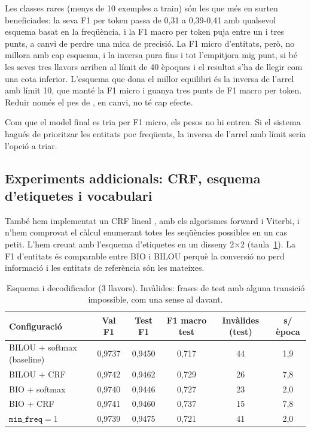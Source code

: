 Les classes rares (menys de 10 exemples a train) són les que més en surten beneficiades: la seva F1 per token passa
de 0,31 a 0,39-0,41 amb qualsevol esquema basat en la freqüència, i la F1 macro per token puja entre un i tres
punts, a canvi de perdre una mica de precisió. La F1 micro d'entitats, però, no millora amb cap esquema, i la
inversa pura fins i tot l'empitjora mig punt, si bé les seves tres llavors arriben al límit de 40 èpoques i el
resultat s'ha de llegir com una cota inferior. L'esquema que dona el millor equilibri és la inversa de l'arrel amb
límit 10, que manté la F1 micro i guanya tres punts de F1 macro per token. Reduir només el pes de , en
canvi, no té cap efecte.

Com que el model final es tria per F1 micro, els pesos no hi entren. Si el sistema hagués de prioritzar les
entitats poc freqüents, la inversa de l'arrel amb límit seria l'opció a triar.

\subsection{Experiments addicionals: CRF, esquema d'etiquetes i vocabulari}
\label{sec:extres}

També hem implementat un CRF lineal \citep{crf}, amb els algorismes forward i Viterbi, i n'hem comprovat el
càlcul enumerant totes les seqüències possibles en un cas petit. L'hem creuat amb l'esquema d'etiquetes en un
disseny 2$\times$2 (taula~\ref{tab:extres}). La F1 d'entitats és comparable entre BIO i BILOU perquè la conversió
no perd informació i les entitats de referència són les mateixes.

\begin{table}[ht]
\centering\small
\caption{Esquema i decodificador (3 llavors). Invàlides: frases de test amb alguna transició impossible, com una
 sense  al davant.}
\label{tab:extres}
\begin{tabular}{lccccc}
\toprule
Configuració & Val F1 & Test F1 & F1 macro test & Invàlides (test) & s/època \\
\midrule
BILOU + softmax (baseline) & 0,9737 & 0,9450 & 0,717 & 44 & 1,9 \\
BILOU + CRF                & 0,9742 & 0,9462 & 0,729 & 26 & 7,8 \\
BIO + softmax              & 0,9740 & 0,9446 & 0,727 & 23 & 2,0 \\
BIO + CRF                  & 0,9741 & 0,9460 & 0,737 & 15 & 7,8 \\
$\texttt{min\_freq}=1$     & 0,9739 & 0,9475 & 0,721 & 41 & 2,0 \\
\bottomrule
\end{tabular}
\end{table}

